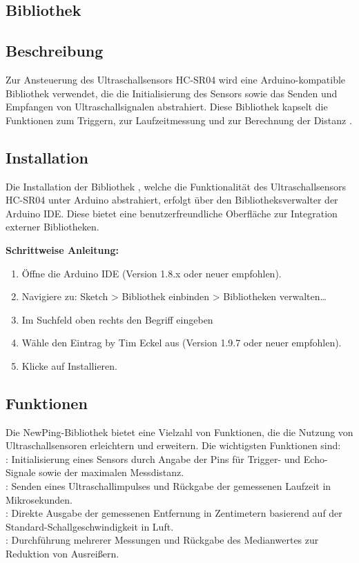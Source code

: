 \subsection{Bibliothek}

\subsection*{Beschreibung}
Zur Ansteuerung des Ultraschallsensors HC-SR04 wird eine Arduino-kompatible Bibliothek
 verwendet, die die Initialisierung des Sensors sowie das Senden und Empfangen von
Ultraschallsignalen abstrahiert. Diese Bibliothek kapselt die Funktionen zum Triggern, zur
Laufzeitmessung und zur Berechnung der Distanz \cite{Arduino:2024}.

\subsection*{Installation}
Die Installation der Bibliothek , welche die Funktionalität des Ultraschallsensors HC-SR04 unter Arduino abstrahiert, erfolgt über den Bibliotheksverwalter der Arduino IDE. Diese
bietet eine benutzerfreundliche Oberfläche zur Integration externer Bibliotheken.
\cite{Arduino:2024}

\textbf{Schrittweise Anleitung:}
\begin{enumerate}
	\item Öffne die Arduino IDE (Version 1.8.x oder neuer empfohlen).
	\item Navigiere zu: Sketch > Bibliothek einbinden > Bibliotheken verwalten…
	\item Im Suchfeld oben rechts den Begriff  eingeben
	\item Wähle den Eintrag  by Tim Eckel aus (Version 1.9.7 oder neuer empfohlen).
	\item Klicke auf \glqq Installieren\grqq.
\end{enumerate}

\subsection*{Funktionen}
Die NewPing-Bibliothek bietet eine Vielzahl von Funktionen, die die Nutzung von Ultraschallsensoren erleichtern und erweitern. Die wichtigsten Funktionen sind: \cite{Arduino:2024}\\

: Initialisierung eines Sensors durch Angabe der Pins für Trigger- und Echo-Signale sowie der maximalen Messdistanz.\\
: Senden eines Ultraschallimpulses und Rückgabe der gemessenen Laufzeit in Mikrosekunden.\\
: Direkte Ausgabe der gemessenen Entfernung in Zentimetern basierend auf der Standard-Schallgeschwindigkeit in Luft.\\
: Durchführung mehrerer Messungen und Rückgabe des Medianwertes zur Reduktion von Ausreißern.\\

